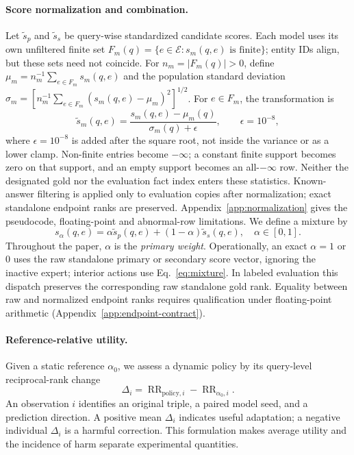 \documentclass[11pt,a4paper]{article}
\newcommand{\RR}{\operatorname{RR}}
\begin{document}
\paragraph{Score normalization and combination.}
Let $\widetilde s_p$ and $\widetilde s_s$ be query-wise standardized candidate scores. Each model uses its own unfiltered finite set $F_m(q)=\{e\in\mathcal E:s_m(q,e)\text{ is finite}\}$; entity IDs align, but these sets need not coincide. For $n_m=|F_m(q)|>0$, define $\mu_m=n_m^{-1}\sum_{e\in F_m}s_m(q,e)$ and the population standard deviation $\sigma_m=[n_m^{-1}\sum_{e\in F_m}(s_m(q,e)-\mu_m)^2]^{1/2}$. For $e\in F_m$, the transformation is
\begin{equation}
\widetilde s_m(q,e)=\frac{s_m(q,e)-\mu_m(q)}{\sigma_m(q)+\epsilon},
\qquad \epsilon=10^{-8},
\label{eq:zscore}
\end{equation}
where $\epsilon=10^{-8}$ is added after the square root, not inside the variance or as a lower clamp. Non-finite entries become $-\infty$; a constant finite support becomes zero on that support, and an empty support becomes an all-$-\infty$ row. Neither the designated gold nor the evaluation fact index enters these statistics. Known-answer filtering is applied only to evaluation copies after normalization; exact standalone endpoint ranks are preserved. Appendix~\ref{app:normalization} gives the pseudocode, floating-point and abnormal-row limitations. We define a mixture by
\begin{equation}
s_\alpha(q,e)=\alpha\widetilde s_p(q,e)+(1-\alpha)\widetilde s_s(q,e),
\quad \alpha\in[0,1].
\label{eq:mixture}
\end{equation}
Throughout the paper, $\alpha$ is the \emph{primary weight}. Operationally, an exact $\alpha=1$ or 0 uses the raw standalone primary or secondary score vector, ignoring the inactive expert; interior actions use Eq.~\eqref{eq:mixture}. In labeled evaluation this dispatch preserves the corresponding raw standalone gold rank. Equality between raw and normalized endpoint ranks requires qualification under floating-point arithmetic (Appendix~\ref{app:endpoint-contract}).

\paragraph{Reference-relative utility.}
Given a static reference $\alpha_0$, we assess a dynamic policy by its query-level reciprocal-rank change
\begin{equation}
\Delta_i=\RR_{\mathrm{policy},i}-\RR_{\alpha_0,i}.
\label{eq:delta}
\end{equation}
An observation $i$ identifies an original triple, a paired model seed, and a prediction direction. A positive mean $\Delta_i$ indicates useful adaptation; a negative individual $\Delta_i$ is a harmful correction. This formulation makes average utility and the incidence of harm separate experimental quantities.
\end{document}
